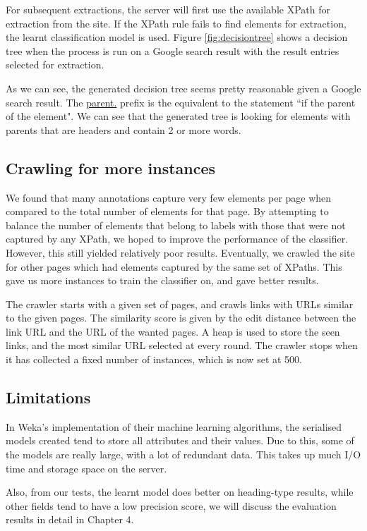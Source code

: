 	
	
	For subsequent extractions, the server will first use the available XPath for extraction from the site. If the XPath rule fails to find elements for extraction, the learnt classification model is used. Figure \ref{fig:decisiontree} shows a decision tree when the process is run on a Google search result with the result entries selected for extraction.
	
	
	As we can see, the generated decision tree seems pretty reasonable given a Google search result. The \url{parent.}	prefix is the equivalent to the statement ``if the parent of the element". We can see that the generated tree is looking for elements with parents that are headers and contain 2 or more words.
	
\subsection{Crawling for more instances}
	We found that many annotations capture very few elements per page when compared to the total number of elements for that page. By attempting to balance the number of elements that belong to labels with those that were not captured by any XPath, we hoped to improve the performance of the classifier. However, this still yielded relatively poor results. Eventually, we crawled the site for other pages which had elements captured by the same set of XPaths. This gave us more instances to train the classifier on, and gave better results.
	
The crawler starts with a given set of pages, and crawls links with URLs similar to the given pages. The similarity score is given by the edit distance between the link URL and the URL of the wanted pages. A heap is used to store the seen links, and the most similar URL selected at every round. The crawler stops when it has collected a fixed number of instances, which is now set at 500.
	
\subsection{Limitations}
In Weka's implementation of their machine learning algorithms, the serialised models created tend to store all attributes and their values. Due to this, some of the models are really large, with a lot of redundant data. This takes up much I/O time and storage space on the server.

Also, from our tests, the learnt model does better on heading-type results, while other fields tend to have a low precision score, we will discuss the evaluation results in detail in Chapter 4.
	
	

